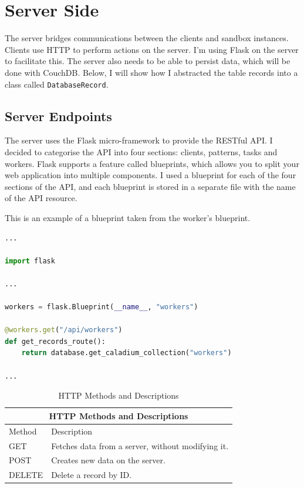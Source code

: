 \section{Server Side}
The server bridges communications between the clients and sandbox instances.
Clients use HTTP to perform actions on the server.
I'm using Flask on the server to facilitate this.
The server also needs to be able to persist data,
which will be done with CouchDB.
Below, I will show how I abstracted the table
records into a class called \texttt{DatabaseRecord}.

\subsection{Server Endpoints}
The server uses the Flask micro-framework to provide the RESTful API.
I decided to categorise the API into four sections:
clients, patterns, tasks and workers.
Flask supports a feature called blueprints,
which allows you to split your web application into multiple components.
I used a blueprint for each of the four sections of the API,
and each blueprint is stored in a separate file
with the name of the API resource.

This is an example of a blueprint taken from the worker's blueprint.
\begin{lstlisting}[language=python]
...

import flask

...

workers = flask.Blueprint(__name__, "workers")

@workers.get("/api/workers")
def get_records_route():
    return database.get_caladium_collection("workers")

...
\end{lstlisting}

\begin{table}
    \centering
    \begin{tabular}{|p{2cm}|p{6cm}|}
        \hline
        \multicolumn{2}{|c|}{HTTP Methods and Descriptions} \\
        \hline
        Method & Description \\
        \hline
        GET & Fetches data from a server, without modifying it. \\
        \hline
        POST & Creates new data on the server. \\
        \hline
        DELETE & Delete a record by ID. \\
        \hline
    \end{tabular}
    \caption{HTTP Methods and Descriptions}
    \label{table:httpMethods}
\end{table}


